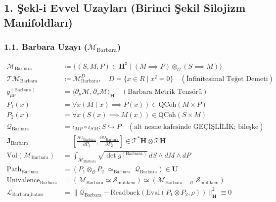 \documentclass[11pt, a4paper]{article}
\begin{document}
\subsection{1. Şekl-i Evvel Uzayları (Birinci Şekil Silojizm Manifoldları)}

\subsubsection{1.1. Barbara Uzayı ($\mathcal{M}_{\text{Barbara}}$)}
\begin{align}
\mathcal{M}_{\text{Barbara}} &\coloneqq \{ (S, M, P) \in \mathbf{H}^3 \mid (M \implies P) \otimes_{\mathcal{O}} (S \implies M) \} \\
\mathcal{T}\mathcal{M}_{\text{Barbara}} &\coloneqq \mathcal{M}_{\text{Barbara}}^D, \quad D = \{x \in R \mid x^2 = 0\} \quad (\text{İnfinitesimal Teğet Demeti}) \\
g_{\mu\nu}^{(\text{Barbara})} &= \langle \partial_\mu \mathcal{M}, \partial_\nu \mathcal{M} \rangle_{\mathbf{H}} \quad (\text{Barbara Metrik Tensörü}) \\
P_1(x) &= \forall x (M(x) \implies P(x)) \in \text{QCoh}(M \times P) \\
P_2(x) &= \forall x (S(x) \implies M(x)) \in \text{QCoh}(S \times M) \\
\mathcal{Q}_{\text{Barbara}} &= \iota_{MP} \circ \iota_{SM} : S \hookrightarrow P \quad (\text{alt nesne kafesinde GEÇİŞLİLİK; bileşke}) \\
\mathbf{J}_{\text{Barbara}} &= \left[ \frac{\partial \mathcal{Q}_{\text{Barbara}}}{\partial P_1}, \frac{\partial \mathcal{Q}_{\text{Barbara}}}{\partial P_2} \right] \in \mathcal{T}^*\mathbf{H} \otimes \mathcal{T}\mathbf{H} \\
\text{Vol}(\mathcal{M}_{\text{Barbara}}) &= \int_{\mathcal{M}_{\text{Barbara}}} \sqrt{\det g^{(\text{Barbara})}} \, dS \wedge dM \wedge dP \\
\text{Path}_{\text{Barbara}} &= (P_1 \otimes_{\mathcal{O}} P_2 \;\simeq_{\text{Barbara}}\; \mathcal{Q}_{\text{Barbara}}) \in \mathbf{U} \\
\text{Univalence}_{\text{Barbara}} &= (\mathcal{M}_{\text{Barbara}} \simeq \mathcal{S}_{\text{muhkem}}) \simeq (\mathcal{M}_{\text{Barbara}} =_{\mathcal{U}} \mathcal{S}_{\text{muhkem}}) \\
\mathcal{L}_{\text{Barbara\_hatası}} &= \| \mathcal{Q}_{\text{Barbara}} - \text{Readback}(\text{Eval}(P_1 \otimes P_2, \rho)) \|_{\mathbf{H}}^2 \equiv 0
\end{align}
\end{document}
